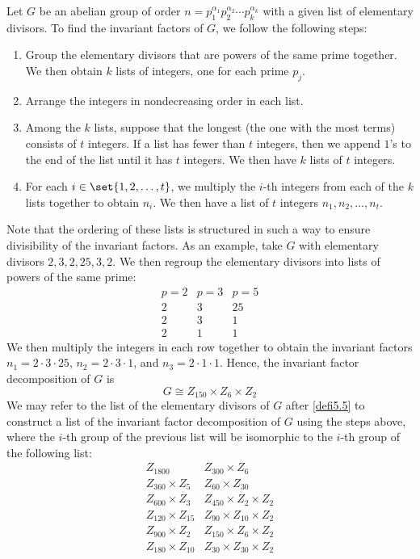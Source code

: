 \begin{ex}
        Let $G$ be an abelian group of order $n = p_1^{\alpha_1} p_2^{\alpha_2} \cdots p_k^{\alpha_k}$ with a given list of elementary divisors. To find the invariant factors of $G$, we follow the following steps:
    \begin{enumerate}
        \item Group the elementary divisors that are powers of the same prime together. We then obtain $k$ lists of integers, one for each prime $p_j$.
        \item Arrange the integers in nondecreasing order in each list.
        \item Among the $k$ lists, suppose that the longest (the one with the most terms) consists of $t$ integers. If a list has fewer than $t$ integers, then we append $1$'s to the end of the list until it has $t$ integers. We then have $k$ lists of $t$ integers.
        \item For each $i \in \set{1, 2, \ldots, t}$, we multiply the $i$-th integers from each of the $k$ lists together to obtain $n_i$. We then have a list of $t$ integers $n_1, n_2, \ldots, n_t$.
    \end{enumerate}

    Note that the ordering of these lists is structured in such a way to ensure divisibility of the invariant factors. As an example, take $G$ with elementary divisors $2, 3, 2, 25, 3, 2$. We then regroup the elementary divisors into lists of powers of the same prime:
    \[
    \begin{array}{c|c|c}
        p = 2 & p = 3 & p = 5 \\
        \hline
        2 & 3 & 25 \\
        2 & 3 & 1 \\
        2 & 1 & 1
    \end{array}\]
    We then multiply the integers in each row together to obtain the invariant factors $n_1 = 2 \cdot 3 \cdot 25$, $n_2 = 2 \cdot 3 \cdot 1$, and $n_3 = 2 \cdot 1 \cdot 1$. Hence, the invariant factor decomposition of $G$ is
    \[G \cong Z_{150} \times Z_6 \times Z_2\]
    We may refer to the list of the elementary divisors of $G$ after \autoref{defi5.5} to construct a list of the invariant factor decomposition of $G$ using the steps above, where the $i$-th group of the previous list will be isomorphic to the $i$-th group of the following list:
    \[
    \begin{array}{ll}
        Z_{1800} & Z_{300} \times Z_6 \\
        Z_{360} \times Z_5 & Z_{60} \times Z_{30} \\
        Z_{600} \times Z_3 & Z_{450} \times Z_2 \times Z_2 \\
        Z_{120} \times Z_{15} & Z_{90} \times Z_{10} \times Z_2 \\
        Z_{900} \times Z_2 & Z_{150} \times Z_6 \times Z_2 \\
        Z_{180} \times Z_{10} & Z_{30} \times Z_{30} \times Z_2
    \end{array}\]
\end{ex}

